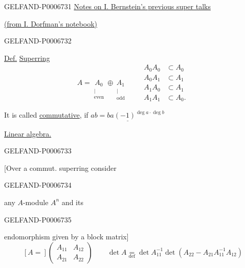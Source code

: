 \begin{GelfandAdjacentEvidence}{GELFAND-P000673}{1}
\underline{Notes on I. Bernstein’s previous super talks}

\uline{(from I. Dorfman’s notebook)}
\end{GelfandAdjacentEvidence}
\begin{GelfandAdjacentEvidence}{GELFAND-P000673}{2}


\underline{Def.} \underline{Superring}
\[
A=\underset{\substack{\vert\\\text{even}}}{A_0}\oplus
  \underset{\substack{\vert\\\text{odd}}}{A_1}
\qquad
\begin{aligned}
 A_0A_0&\subset A_0\\
 A_0A_1&\subset A_1\\
 A_1A_0&\subset A_1\\
 A_1A_1&\subset A_0.
\end{aligned}
\]

It is called \underline{commutative}, if
\(\underline{ab=ba(-1)^{\deg a\cdot\deg b}}\)

\underline{Linear algebra.}
\end{GelfandAdjacentEvidence}
\begin{GelfandAdjacentEvidence}{GELFAND-P000673}{3}

[Over a commut. superring consider
\end{GelfandAdjacentEvidence}
\begin{GelfandAdjacentEvidence}{GELFAND-P000673}{4}

any \(A\)-module \(A^n\) and its
\end{GelfandAdjacentEvidence}
\begin{GelfandAdjacentEvidence}{GELFAND-P000673}{5}

endomorphism given by a block matrix]
\[
[A=]\begin{pmatrix}A_{11}&A_{12}\\ A_{21}&A_{22}\end{pmatrix}
\qquad
\det A\underset{\mathrm{def}}{=}
\det A_{11}^{-1}\det(A_{22}-A_{21}A_{11}^{-1}A_{12})
\]
\end{GelfandAdjacentEvidence}
